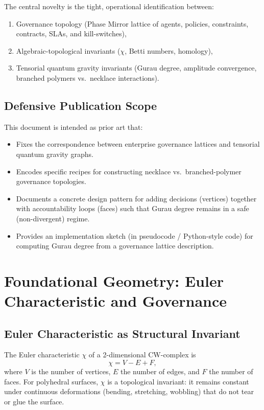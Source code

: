 \documentclass[11pt]{article}
\begin{document}
The central novelty is the tight, operational identification between:
\begin{enumerate}
  \item Governance topology (Phase Mirror lattice of agents, policies, constraints, contracts, SLAs, and kill-switches),
  \item Algebraic-topological invariants (\(\chi\), Betti numbers, homology),
  \item Tensorial quantum gravity invariants (Gurau degree, amplitude convergence, branched polymers vs.\ necklace interactions).
\end{enumerate}

\subsection{Defensive Publication Scope}

This document is intended as prior art that:
\begin{itemize}
  \item Fixes the correspondence between enterprise governance lattices and tensorial quantum gravity graphs.
  \item Encodes specific recipes for constructing necklace vs.\ branched-polymer governance topologies.
  \item Documents a concrete design pattern for adding decisions (vertices) together with accountability loops (faces) such that Gurau degree remains in a safe (non-divergent) regime.
  \item Provides an implementation sketch (in pseudocode / Python-style code) for computing Gurau degree from a governance lattice description.
\end{itemize}

\section{Foundational Geometry: Euler Characteristic and Governance}

\subsection{Euler Characteristic as Structural Invariant}

The Euler characteristic \(\chi\) of a 2-dimensional CW-complex is
\[
\chi = V - E + F,
\]
where \(V\) is the number of vertices, \(E\) the number of edges, and \(F\) the number of faces. For polyhedral surfaces, \(\chi\) is a topological invariant: it remains constant under continuous deformations (bending, stretching, wobbling) that do not tear or glue the surface.
\end{document}
